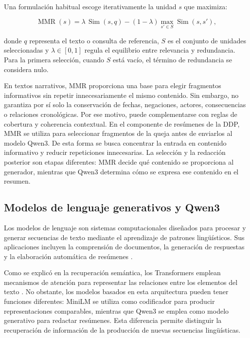 Una formulación habitual escoge iterativamente la unidad $s$ que maximiza:

\begin{equation}
    \operatorname{MMR}(s) =
    \lambda\,\operatorname{Sim}(s,q) -
    (1-\lambda)\max_{s'\in S}
    \operatorname{Sim}(s,s'),
    \label{eq:mmr}
\end{equation}

donde $q$ representa el texto o consulta de referencia, $S$ es el conjunto de unidades seleccionadas y $\lambda\in[0,1]$ regula el equilibrio entre relevancia y redundancia. Para la primera selección, cuando $S$ está vacío, el término de redundancia se considera nulo.

En textos narrativos, MMR proporciona una base para elegir fragmentos informativos sin repetir innecesariamente el mismo contenido. Sin embargo, no garantiza por sí solo la conservación de fechas, negaciones, actores, consecuencias o relaciones cronológicas. Por ese motivo, puede complementarse con reglas de cobertura y coherencia contextual. En el componente de resúmenes de la DDP, MMR se utiliza para seleccionar fragmentos de la queja antes de enviarlos al modelo Qwen3. De esta forma se busca concentrar la entrada en contenido informativo y reducir repeticiones innecesarias. La selección y la redacción posterior son etapas diferentes: MMR decide qué contenido se proporciona al generador, mientras que Qwen3 determina cómo se expresa ese contenido en el resumen.

\subsection{Modelos de lenguaje generativos y Qwen3}

Los modelos de lenguaje son sistemas computacionales diseñados para procesar y generar secuencias de texto mediante el aprendizaje de patrones lingüísticos. Sus aplicaciones incluyen la comprensión de documentos, la generación de respuestas y la elaboración automática de resúmenes \cite{jurafsky2023slp}.

Como se explicó en la recuperación semántica, los Transformers emplean mecanismos de atención para representar las relaciones entre los elementos del texto \cite{vaswani2017attention}. No obstante, los modelos basados en esta arquitectura pueden tener funciones diferentes: MiniLM se utiliza como codificador para producir representaciones comparables, mientras que Qwen3 se emplea como modelo generativo para redactar resúmenes. Esta diferencia permite distinguir la recuperación de información de la producción de nuevas secuencias lingüísticas.

